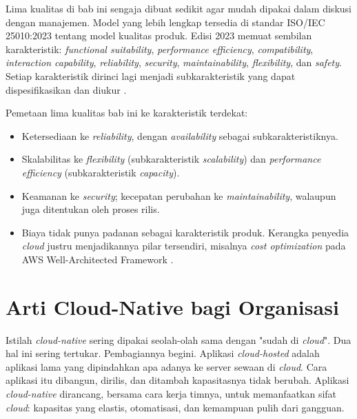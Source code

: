 \begin{pendalaman}[title={Pendalaman Teknis (opsional): Model Kualitas ISO/IEC 25010}]
  Lima kualitas di bab ini sengaja dibuat sedikit agar mudah dipakai dalam diskusi
  dengan manajemen. Model yang lebih lengkap tersedia di standar ISO/IEC 25010:2023
  tentang model kualitas produk. Edisi 2023 memuat sembilan karakteristik:
  \textit{functional suitability}, \textit{performance efficiency},
  \textit{compatibility}, \textit{interaction capability}, \textit{reliability},
  \textit{security}, \textit{maintainability}, \textit{flexibility}, dan
  \textit{safety}. Setiap karakteristik dirinci lagi menjadi subkarakteristik yang
  dapat dispesifikasikan dan diukur \cite{c01-iso25010}.

  Pemetaan lima kualitas bab ini ke karakteristik terdekat:
  \begin{itemize}
    \item Ketersediaan ke \textit{reliability}, dengan \textit{availability} sebagai
          subkarakteristiknya.
    \item Skalabilitas ke \textit{flexibility} (subkarakteristik \textit{scalability})
          dan \textit{performance efficiency} (subkarakteristik \textit{capacity}).
    \item Keamanan ke \textit{security}; kecepatan perubahan ke
          \textit{maintainability}, walaupun juga ditentukan oleh proses rilis.
    \item Biaya tidak punya padanan sebagai karakteristik produk. Kerangka penyedia
          \textit{cloud} justru menjadikannya pilar tersendiri, misalnya
          \textit{cost optimization} pada AWS Well-Architected Framework
          \cite{awswaf}.
  \end{itemize}
\end{pendalaman}

\section{Arti Cloud-Native bagi Organisasi}

Istilah \textit{cloud-native} sering dipakai seolah-olah sama dengan "sudah di
\textit{cloud}". Dua hal ini sering tertukar. Pembagiannya begini. Aplikasi
\textit{cloud-hosted} adalah aplikasi lama yang dipindahkan apa adanya ke server sewaan
di \textit{cloud}. Cara aplikasi itu dibangun, dirilis, dan ditambah kapasitasnya tidak
berubah. Aplikasi \textit{cloud-native} dirancang, bersama cara kerja timnya, untuk
memanfaatkan sifat \textit{cloud}: kapasitas yang elastis, otomatisasi, dan kemampuan
pulih dari gangguan.

